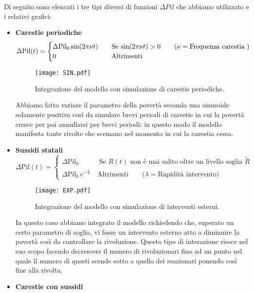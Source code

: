 Di seguito sono elencati i tre tipi diversi di funzioni $ \Delta Pil $ che abbiamo utilizzato e i relativi grafici:
\begin{itemize}
	\item \textbf{Carestie periodiche}\\
\begin{equation}
	\Delta\text{Pil}(t)=
	\begin{cases}
		\Delta\text{Pil}_0\sin(2\pi\nu t)\qquad \text{Se $ \sin(2\pi\nu t)>0 $} \qquad (\nu=\text{Frequenza carestia }) \\
		0 \qquad \qquad\qquad \qquad \,\text{Altrimenti}
	\end{cases}
\end{equation}
\begin{figure}[H]
	\centering
	\texttt{[image: SIN.pdf]}
	\caption{Integrazione del modello con simulazione di carestie periodiche.}
\end{figure}
Abbiamo fatto variare il parametro della povertà secondo una sinusoide solamente positiva così da simulare brevi periodi di carestie in cui la povertà cresce per poi annullarsi per brevi periodi: in questo modo il modello manifesta tante rivolte che scemano nel momento in cui la carestia cessa.\\
\item \textbf{Sussidi statali}\\
\begin{equation}
	\Delta\text{Pil}(t)=
	\begin{cases}
		\Delta\text{Pil}_0 \qquad \quad \text{Se $R(t)$ non è mai salito oltre un livello soglia $\tilde{R}$}\\
		\Delta\text{Pil}_0\ e^{-\frac{t}{\lambda}} \quad \text{Altrimenti}\qquad     \text{($\lambda=$Rapidità intervento)}
	\end{cases}
\end{equation}
\begin{figure}[H]
	\centering
	\texttt{[image: EXP.pdf]}
	\caption{Integrazione del modello con simulazione di interventi esterni.}
\end{figure}
In questo caso abbiamo integrato il modello richiedendo che, superato un certo parametro di soglia, vi fosse un intervento esterno atto a diminuire la povertà così da controllare la rivoluzione. Questo tipo di interazione riesce nel suo scopo facendo decrescere il numero di rivoluzionari fino ad un punto nel quale il numero di questi scende sotto a quello dei reazionari ponendo così fine alla rivolta.
\item \textbf{Carestie con sussidi}

\end{itemize}

